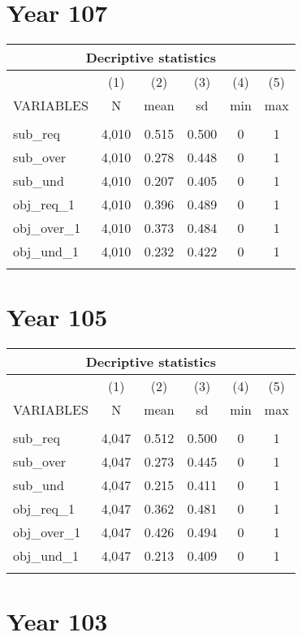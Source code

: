 \documentclass[A4]{article}
\begin{document}
\section*{Year 107}
\begin{tabular}{lccccc}
\multicolumn{6}{c}{Decriptive statistics} \\ \hline
 & (1) & (2) & (3) & (4) & (5) \\
VARIABLES & N & mean & sd & min & max \\ \hline
 &  &  &  &  &  \\
sub\_req & 4,010 & 0.515 & 0.500 & 0 & 1 \\
sub\_over & 4,010 & 0.278 & 0.448 & 0 & 1 \\
sub\_und & 4,010 & 0.207 & 0.405 & 0 & 1 \\
obj\_req\_1 & 4,010 & 0.396 & 0.489 & 0 & 1 \\
obj\_over\_1 & 4,010 & 0.373 & 0.484 & 0 & 1 \\
obj\_und\_1 & 4,010 & 0.232 & 0.422 & 0 & 1 \\
 &  &  &  &  &  \\ \hline
\end{tabular}

\section*{Year 105}

\begin{tabular}{lccccc}
\multicolumn{6}{c}{Decriptive statistics} \\ \hline
 & (1) & (2) & (3) & (4) & (5) \\
VARIABLES & N & mean & sd & min & max \\ \hline
 &  &  &  &  &  \\
sub\_req & 4,047 & 0.512 & 0.500 & 0 & 1 \\
sub\_over & 4,047 & 0.273 & 0.445 & 0 & 1 \\
sub\_und & 4,047 & 0.215 & 0.411 & 0 & 1 \\
obj\_req\_1 & 4,047 & 0.362 & 0.481 & 0 & 1 \\
obj\_over\_1 & 4,047 & 0.426 & 0.494 & 0 & 1 \\
obj\_und\_1 & 4,047 & 0.213 & 0.409 & 0 & 1 \\
 &  &  &  &  &  \\ \hline
\end{tabular}


\section*{Year 103}
\end{document}
